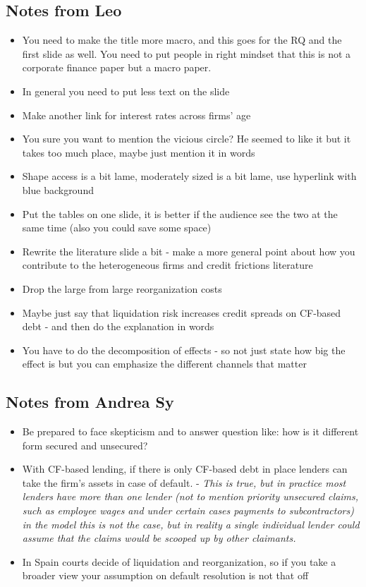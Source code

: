 \documentclass[12pt]{article}
\begin{document}
\subsection*{Notes from Leo} 
\begin{itemize} \setlength\itemsep{0em}  \small
    \item You need to make the title more macro, and this goes for the RQ and the first slide as well. You need to put people in right mindset that this is not a corporate finance paper but a macro paper.
    \item In general you need to put less text on the slide
    \item Make another link for interest rates across firms' age 
    \item You sure you want to mention the vicious circle? He seemed to like it but it takes too much place, maybe just mention it in words
    \item Shape access is a bit lame, moderately sized is a bit lame, use hyperlink with blue background
    \item Put the tables on one slide, it is better if the audience see the two at the same time (also you could save some space)
    \item Rewrite the literature slide a bit - make a more general point about how you contribute to the heterogeneous firms and credit frictions literature
    \item Drop the large from large reorganization costs
    \item Maybe just say that liquidation risk increases credit spreads on CF-based debt - and then do the explanation in words
    \item You have to do the decomposition of effects - so not just state how big the effect is but you can emphasize the different channels that matter    
\end{itemize} \normalsize

\subsection*{Notes from Andrea Sy} 
\begin{itemize} \setlength\itemsep{0em}  \small
    \item Be prepared to face skepticism and to answer question like:  how is it different form secured and unsecured? 
    \item With CF-based lending, if there is only CF-based debt in place lenders can take the firm's assets in case of default. - \textit{This is true, but in practice most lenders have more than one lender (not to mention priority unsecured claims, such as employee wages and under certain cases payments to subcontractors) in the model this is not the case, but in reality a single individual lender could assume that the claims would be scooped up by other claimants.}
    \item In Spain courts decide of liquidation and reorganization, so if you take a broader view your assumption on default resolution is not that off
\end{itemize} \normalsize
\end{document}
